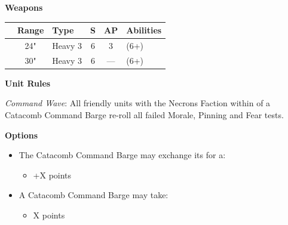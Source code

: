 \begin{minipage}[t]{0.72\textwidth}
	\vspace*{2em}
	\textbf{Weapons}
	
	\begin{tabular}{L{90 pt} c C{40pt} *{2}{c} >{\raggedright\arraybackslash}p{130pt}}
		& Range & Type & S & AP & Abilities \\
		\hline
		 & 24" & Heavy 3 & 6 & 3 &  (6+) \\
		 & 30" & Heavy 3 & 6 & — &  (6+) \\
	\end{tabular}
	
	\vspace*{2em}
	\textbf{Unit Rules}
	
	\textit{Command Wave}: All friendly units with the Necrons Faction within  of a Catacomb Command Barge re-roll all failed Morale, Pinning and Fear tests.
	
	\vspace*{2em}
	\textbf{Options}
	\begin{itemize}
		\item The Catacomb Command Barge may exchange its  for a:
		\begin{itemize}
			\item {} \dotfill +X points
		\end{itemize}
		\item A Catacomb Command Barge may take:
		\begin{itemize}
			\item {} \dotfill X points
		\end{itemize} 
	\end{itemize}
\end{minipage}



\newpage
\subsubsection[Cryptek Conclave]{}

